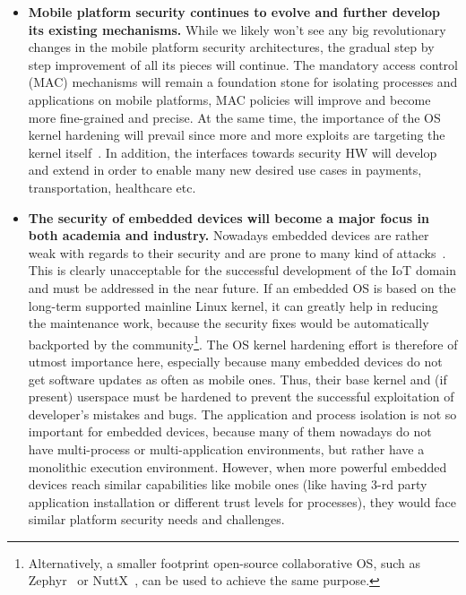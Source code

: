\begin{itemize}
	\item \textbf{Mobile platform security continues to evolve and further develop its existing mechanisms.} While we likely won't see any big revolutionary changes in the mobile platform security architectures, the gradual step by step improvement of all its pieces will continue. The mandatory access control (MAC) mechanisms will remain a foundation stone for isolating processes and applications on mobile platforms, MAC policies will improve and become more fine-grained and precise. At the same time, the importance of the OS kernel hardening will prevail since more and more exploits are targeting the kernel itself~\cite{stoep2016android}. In addition, the interfaces towards security HW will develop and extend in order to enable many new desired use cases in payments, transportation, healthcare etc.
		
	\item \textbf{The security of embedded devices will become a major focus in both academia and industry.} Nowadays embedded devices are rather weak with regards to their security and are prone to many kind of attacks~\cite{Choo2016}. This is clearly unacceptable for the successful development of the IoT domain and must be addressed in the near future. If an embedded OS is based on the long-term supported mainline Linux kernel, it can greatly help in reducing the maintenance work, because the security fixes would be automatically backported by the community\footnote{Alternatively, a smaller footprint open-source collaborative OS, such as Zephyr~\cite{zephyr} or NuttX~\cite{NuttX}, can be used to achieve the same purpose.}. The OS kernel hardening effort is therefore of utmost importance here, especially because many embedded devices do not get software updates as often as mobile ones. Thus, their base kernel and (if present) userspace must be hardened to prevent the successful exploitation of developer's mistakes and bugs. The application and process isolation is not so important for embedded devices, because many of them nowadays do not have multi-process or multi-application environments, but rather have a monolithic execution environment. However, when more powerful embedded devices reach similar capabilities like mobile ones (like having 3-rd party application installation or different trust levels for processes), they would face similar platform security needs and challenges.
	

\end{itemize}
